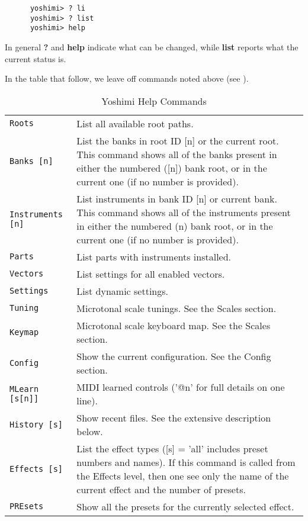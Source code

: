    \begin{verbatim}
      yoshimi> ? li
      yoshimi> ? list
      yoshimi> help
   \end{verbatim}

   In general \textbf{?} and \textbf{help} indicate what can be changed, while
   \textbf{list} reports what the current status is.

   In the table that follow, we leave off commands noted above
   (see ).

\begin{center}
\begin{longtable}{p{4cm} p{10cm}}
\caption[Yoshimi Help Commands]{Yoshimi Help Commands} \\

\texttt{Roots} &
   List all available root paths. \\
\texttt{Banks [n]} &
   List the banks in root ID [n] or the current root.
   This command shows all of the banks present in either the numbered ([n])
   bank root, or in the current one (if no number is provided).  \\
\texttt{Instruments [n]} &
   List instruments in bank ID [n] or current bank.
   This command shows all of the instruments present in either the numbered
   (n) bank root, or in the current one (if no number is provided).  \\
\texttt{Parts} &
   List parts with instruments installed. \\
\texttt{Vectors} &
   List settings for all enabled vectors. \\
\texttt{Settings} &
   List dynamic settings. \\
\texttt{Tuning} &
   Microtonal scale tunings. See the Scales section. \\
\texttt{Keymap} &
   Microtonal scale keyboard map.  See the Scales section. \\
\texttt{Config} &
   Show the current configuration. See the Config section. \\
\texttt{MLearn [s[n]]} &
   MIDI learned controls ('@n' for full details on one line). \\
\texttt{History [s]} &
   Show recent files. See the extensive description below. \\
\texttt{Effects [s]} &
   List the effect types ([s] = 'all' includes preset numbers and names).
   If this command is called from the Effects level, then one see only the name
   of the current effect and the number of presets. \\
\texttt{PREsets} &
   Show all the presets for the currently selected effect. \\

\end{longtable}
\end{center}

